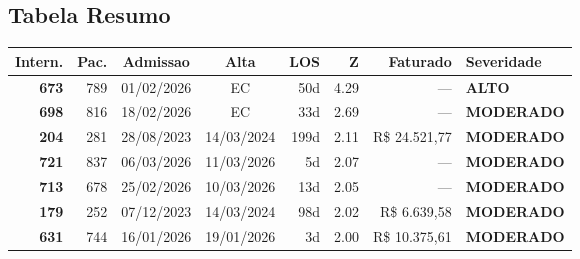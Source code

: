 \documentclass[a4paper,10pt]{article}
\begin{document}
\subsection{Tabela Resumo}
\begin{center}
\begin{longtable}{>{\scriptsize}r>{\scriptsize}r>{\scriptsize}c>{\scriptsize}c>{\scriptsize}r>{\scriptsize}r>{\scriptsize}r>{\scriptsize}l}
\toprule
\textbf{Intern.} & \textbf{Pac.} & \textbf{Admissao} & \textbf{Alta} & \textbf{LOS} & \textbf{Z} & \textbf{Faturado} & \textbf{Severidade} \\
\midrule
\endhead
\bottomrule
\endfoot

\textcolor{anomorange}{\textbf{673}} & 789 & 01/02/2026 & \textcolor{anomorange}{EC} & 50d & \textcolor{anomorange}{4.29} & --- & \textcolor{anomorange}{\textbf{ALTO}} \\

\textcolor{anomyellow}{\textbf{698}} & 816 & 18/02/2026 & \textcolor{anomorange}{EC} & 33d & \textcolor{anomyellow}{2.69} & --- & \textcolor{anomyellow}{\textbf{MODERADO}} \\

\textcolor{anomyellow}{\textbf{204}} & 281 & 28/08/2023 & 14/03/2024 & 199d & \textcolor{anomyellow}{2.11} & R\$ 24.521,77 & \textcolor{anomyellow}{\textbf{MODERADO}} \\

\textcolor{anomyellow}{\textbf{721}} & 837 & 06/03/2026 & 11/03/2026 & 5d & \textcolor{anomyellow}{2.07} & --- & \textcolor{anomyellow}{\textbf{MODERADO}} \\

\textcolor{anomyellow}{\textbf{713}} & 678 & 25/02/2026 & 10/03/2026 & 13d & \textcolor{anomyellow}{2.05} & --- & \textcolor{anomyellow}{\textbf{MODERADO}} \\

\textcolor{anomyellow}{\textbf{179}} & 252 & 07/12/2023 & 14/03/2024 & 98d & \textcolor{anomyellow}{2.02} & R\$ 6.639,58 & \textcolor{anomyellow}{\textbf{MODERADO}} \\

\textcolor{anomyellow}{\textbf{631}} & 744 & 16/01/2026 & 19/01/2026 & 3d & \textcolor{anomyellow}{2.00} & R\$ 10.375,61 & \textcolor{anomyellow}{\textbf{MODERADO}} \\

\end{longtable}\end{center}
\end{document}
